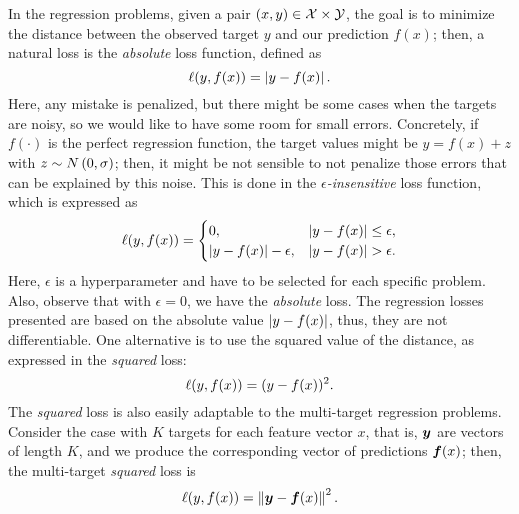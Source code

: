 In the regression problems, given a pair $(x, y) \in \mathcal{X} \times \mathcal{Y}$, the goal is to minimize the distance between the observed target $y$ and our prediction $f(x)$; then, a natural loss is the \emph{absolute} loss function, defined as 
\begin{equation}
    \label{eq:abs_def}
    \lossf(y, f(x)) = \abs{y - f(x)}.
\end{equation}
Here, any mistake is penalized, but there might be some cases when the targets are noisy, so we would like to have some room for small errors. Concretely, if $f(\cdot)$ is the perfect regression function, the target values might be $y = f(x) + z$ with $z \sim N \left(0, \sigma\right)$; then, it might be not sensible to not penalize those errors that can be explained by this noise. This is done in the \emph{$\epsilon$-insensitive} loss function, which is expressed as 
\begin{equation}
    \label{eq:epsins_def}
    \lossf(y, f(x)) = 
    \begin{cases}
        0, & \abs{y - f(x)} \leq \epsilon ,\\
        \abs{y - f(x)} - \epsilon, & \abs{y - f(x)} > \epsilon .\\
    \end{cases}
\end{equation} 
Here, $\epsilon$ is a hyperparameter and have to be selected for each specific problem. Also, observe that with $\epsilon =0$, we have the \emph{absolute} loss.
%
The regression losses presented are based on the absolute value $\left|y - f(x)\right|$, thus, they are not differentiable. One alternative is to use the squared value of the distance, as expressed in the \emph{squared} loss:
\begin{equation}
    \label{eq:sq_def}
    \lossf(y, f(x)) = (y - f(x))^2.
\end{equation}
The \emph{squared} loss is also easily adaptable to the multi-target regression problems. Consider the case with $K$ targets for each feature vector $x$, that is, $\bm{y}$ are vectors of length $K$, and we produce the corresponding vector of predictions $\bm{f}(x)$; then, the multi-target \emph{squared} loss is
\begin{equation}
    \label{eq:sqmulti_def}
    \lossf(y, f(x)) =  \norm{\fv{y} - \fv{f}(x)}^2.
\end{equation}


